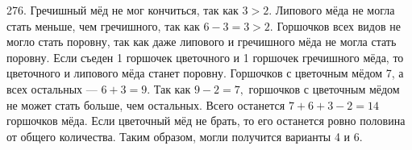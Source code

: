 276. Гречишный мёд не мог кончиться, так как $3>2.$ Липового мёда не могла стать меньше, чем гречишного, так как $6-3=3>2.$ Горшочков всех видов не могло стать поровну, так как даже липового и гречишного мёда не могла стать поровну. Если съеден 1 горшочек цветочного и 1 горшочек гречишного мёда, то цветочного и липового мёда станет поровну. Горшочков с цветочным мёдом 7, а всех остальных --- $6+3=9.$ Так как $9-2=7,$ горшочков с цветочным мёдом не может стать больше, чем остальных. Всего останется $7+6+3-2=14$ горшочков мёда. Если цветочный мёд не брать, то его останется ровно половина от общего количества. Таким образом, могли получится варианты 4 и 6.\\
